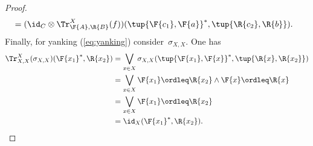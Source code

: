 \begin{proof}
\begin{equation}
\begin{aligned}
        &=(\id_C \otimes \Tr_{\F{A},\R{B}}^X(f))(\tup{\F{c_1},\F{a}}^*,\tup{\R{c_2},\R{b}}).
    \end{aligned}
\end{equation}
Finally, for yanking (\cref{eq:yanking}) consider~$\sigma_{X,X}$. One has
\begin{equation}
    \begin{aligned}
        \Tr_{X,X}^{X}(\sigma_{X,X})(\F{x_1}^*,\R{x_2})&=\bigvee_{x\in X} \sigma_{X,X}(\tup{\F{x_1},\F{x}}^*,\tup{\R{x},\R{x_2}}) \\
        &=\bigvee_{x\in X} \F{x_1} \ordleq \R{x_2} \wedge \F{x}\ordleq \R{x}\\
        &=\bigvee_{x\in X} \F{x_1} \ordleq \R{x_2}\\
        &=\id_X(\F{x_1}^*,\R{x_2}).
    \end{aligned}
\end{equation}
\end{proof}